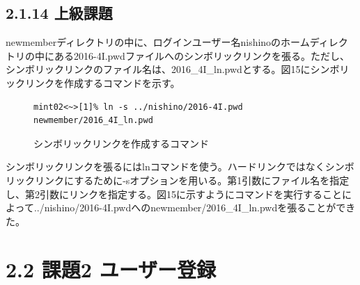 \documentclass[12pt]{jreport}
\begin{document}
            \subsection*{2.1.14 上級課題}
                newmemberディレクトリの中に、ログインユーザー名nishinoのホームディレクトリの中にある2016-4I.pwdファイルへのシンボリックリンクを張る。ただし、シンボリックリンクのファイル名は、2016\_4I\_ln.pwdとする。図15にシンボリックリンクを作成するコマンドを示す。
                \begin{figure}[H]
                    \begin{center}
                        \begin{screen}
                            \begin{verbatim}
mint02<~>[1]% ln -s ../nishino/2016-4I.pwd newmember/2016_4I_ln.pwd
                            \end{verbatim}
                        \end{screen}
                        \caption{シンボリックリンクを作成するコマンド}
                        \label{15}
                    \end{center}
                \end{figure}
                シンボリックリンクを張るにはlnコマンドを使う。ハードリンクではなくシンボリックリンクにするために-sオプションを用いる。第1引数にファイル名を指定し、第2引数にリンクを指定する。図15に示すようにコマンドを実行することによって../nishino/2016-4I.pwdへのnewmember/2016\_4I\_ln.pwdを張ることができた。

        \section*{2.2 課題2 ユーザー登録}
\end{document}
